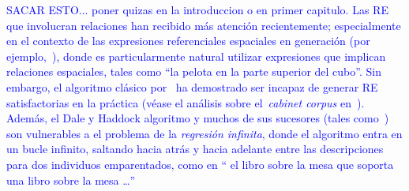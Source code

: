 \textcolor{blue}{SACAR ESTO... poner quizas en la introduccion o en primer capitulo. Las RE que involucran relaciones han recibido m\'as atenci\'on recientemente;
especialmente en el contexto de las expresiones referenciales espaciales en 
generaci\'on (por ejemplo,~\cite{kelleher06:increm}),
donde es particularmente natural utilizar expresiones que implican 
relaciones espaciales, tales como ``la pelota en la parte superior del cubo''. Sin embargo, el
algoritmo cl\'asico
por~\cite{dale91:gener} ha demostrado ser
incapaz de generar RE satisfactorias en la pr\'actica (v\'ease el an\'alisis sobre
el~\emph{cabinet corpus}
en~\cite{viethen06:_algor_for_gener_refer_expres}). Adem\'as, el
Dale y Haddock algoritmo y muchos de sus sucesores (tales
como~\cite{kelleher06:increm}) son vulnerables a
el problema de la \emph{regresi\'on infinita}, donde el algoritmo entra en un
bucle infinito, saltando hacia atr\'as y hacia adelante entre las descripciones para dos
individuos emparentados, como en `` el libro sobre la mesa que soporta una
libro sobre la mesa \ldots ''}




